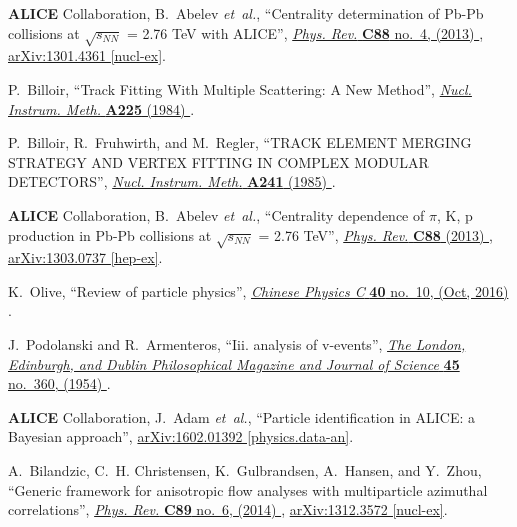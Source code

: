 \documentclass[ALICE,manyauthors]{cernphprep}
\begin{document}
\begin{thebibliography}{10}
{\bfseries ALICE} Collaboration, B.~Abelev {\em et~al.}, ``{Centrality
  determination of Pb-Pb collisions at $\sqrt{s_{NN}}$ = 2.76 TeV with
  ALICE}'', \href{http://dx.doi.org/10.1103/PhysRevC.88.044909}{{\em Phys.
  Rev.} {\bfseries C88} no.~4, (2013) },
\href{http://arxiv.org/abs/1301.4361}{{\ttfamily arXiv:1301.4361 [nucl-ex]}}.

P.~Billoir, ``{Track Fitting With Multiple Scattering: A New Method}'',
\href{http://dx.doi.org/10.1016/0167-5087(84)90274-6}{{\em Nucl. Instrum.
  Meth.} {\bfseries A225} (1984) }.

P.~Billoir, R.~Fruhwirth, and M.~Regler, ``{TRACK ELEMENT MERGING STRATEGY AND
  VERTEX FITTING IN COMPLEX MODULAR DETECTORS}'',
\href{http://dx.doi.org/10.1016/0168-9002(85)90523-6}{{\em Nucl. Instrum.
  Meth.} {\bfseries A241} (1985) }.

{\bfseries ALICE} Collaboration, B.~Abelev {\em et~al.}, ``{Centrality
  dependence of $\pi$, K, p production in Pb-Pb collisions at $\sqrt{s_{NN}}$ =
  2.76 TeV}'', \href{http://dx.doi.org/10.1103/PhysRevC.88.044910}{{\em Phys.
  Rev.} {\bfseries C88} (2013) },
\href{http://arxiv.org/abs/1303.0737}{{\ttfamily arXiv:1303.0737 [hep-ex]}}.

K.~Olive, ``Review of particle physics'',
  \href{http://dx.doi.org/10.1088/1674-1137/40/10/100001}{{\em Chinese Physics
  C} {\bfseries 40} no.~10, (Oct, 2016) }.

J.~Podolanski and R.~Armenteros, ``Iii. analysis of v-events'',
  \href{http://dx.doi.org/10.1080/14786440108520416}{{\em The London,
  Edinburgh, and Dublin Philosophical Magazine and Journal of Science}
  {\bfseries 45} no.~360, (1954) }.

{\bfseries ALICE} Collaboration, J.~Adam {\em et~al.}, ``{Particle
  identification in ALICE: a Bayesian approach}'',
\href{http://arxiv.org/abs/1602.01392}{{\ttfamily arXiv:1602.01392
  [physics.data-an]}}.

A.~Bilandzic, C.~H. Christensen, K.~Gulbrandsen, A.~Hansen, and Y.~Zhou,
  ``{Generic framework for anisotropic flow analyses with multiparticle
  azimuthal correlations}'',
  \href{http://dx.doi.org/10.1103/PhysRevC.89.064904}{{\em Phys. Rev.}
  {\bfseries C89} no.~6, (2014) },
\href{http://arxiv.org/abs/1312.3572}{{\ttfamily arXiv:1312.3572 [nucl-ex]}}.


\end{thebibliography}
\end{document}
